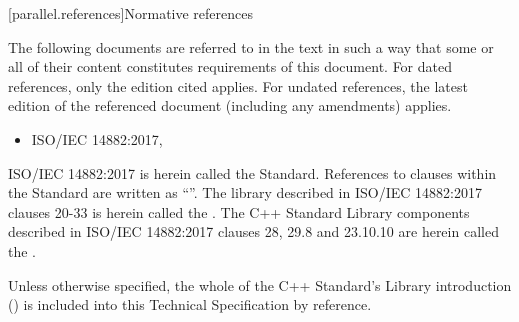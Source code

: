 
[parallel.references]{Normative references}

\pnum
The following documents are referred to in the text in such a way that some or all of their content constitutes
requirements of this document. For dated references, only the
edition cited applies. For undated references, the latest edition
of the referenced document (including any amendments) applies.

\begin{itemize}
\item ISO/IEC 14882:2017,
\end{itemize}

\pnum
ISO/IEC 14882:2017 is herein called the \Cpp Standard.
References to clauses within the \Cpp Standard are written as ``''.
The library described in ISO/IEC 14882:2017 clauses 20-33 is herein called the .
The C++ Standard Library components described in ISO/IEC 14882:2017 clauses 28, 29.8 and 23.10.10 are herein called the .

\pnum
Unless otherwise specified, the whole of the C++ Standard's Library introduction () is included into this Technical Specification by reference.
